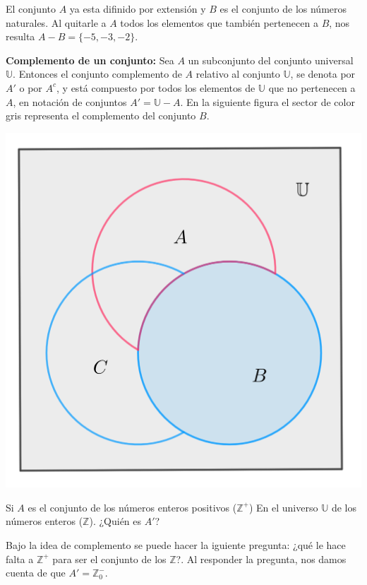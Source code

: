 \begin{solucion}
    El conjunto $A$ ya esta difinido por extensión y $B$ es el conjunto de los números naturales.  Al quitarle a $A$ todos los elementos que también pertenecen a $B$, nos resulta $A-B=\{-5,-3,-2\}$.
\end{solucion}

\textbf{Complemento de un conjunto:} Sea $A$ un subconjunto del conjunto universal $\mathbb{U}$. Entonces el conjunto complemento de $A$ relativo al conjunto $\mathbb{U}$, se denota por $A'$ o por $A^c$, y está compuesto por todos los elementos de $\mathbb{U}$ que no pertenecen a $A$, en notación de conjuntos $A'=\mathbb{U}-A$. En la siguiente figura el sector de color gris representa el complemento del conjunto $B$.

\begin{center}
    \includegraphics[scale=0.7]{Imagenes/IMG1/S1-1-05.png}
\end{center}

\begin{ejemplo}
    Si $A$ es el conjunto de los números enteros positivos ($\mathbb{Z}^{+}$) En el universo $\mathbb{U}$ de los números enteros ($\mathbb{Z}$). ¿Quién es $A'$?
\end{ejemplo}

\begin{solucion}
    Bajo la idea de complemento se puede hacer la iguiente pregunta:  ¿qué le hace falta a $\mathbb{Z}^{+}$ para ser el conjunto de los $\mathbb{Z}$?.  Al responder la pregunta, nos damos cuenta de que $A'=\mathbb{Z}^{-}_{0}$.
\end{solucion}

